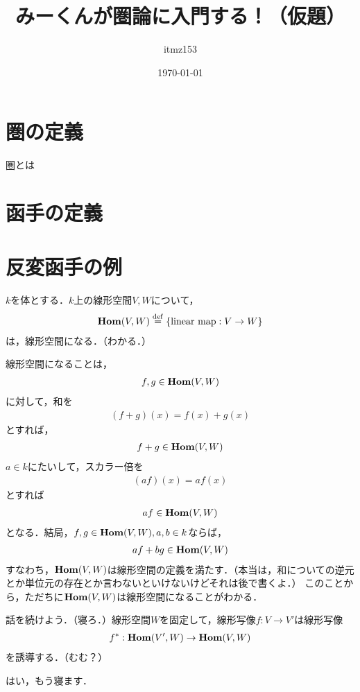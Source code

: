 \documentclass[12pt]{jsarticle}
\title{みーくんが圏論に入門する！（仮題）}
\date{\today}
\author{itmz153}
\begin{document}
\maketitle

\section{圏の定義}
圏とは

\section{函手の定義}

\section{反変函手の例}
$k$を体とする．$k$上の線形空間$V, W$について，
\begin{align*}
{\bold{Hom}}(V, W) \overset{\mathrm{def}}{=} \{{\rm{linear\ map}}: V \to W\}
\end{align*}
は，線形空間になる．（わかる．）

線形空間になることは，
\begin{align*}
f, g \in {\bold{Hom}}(V, W)
\end{align*}
に対して，和を
\begin{align*}
(f + g)(x) = f(x) + g(x)
\end{align*}
とすれば，
\begin{align*}
f + g \in {\bold{Hom}}(V, W)
\end{align*}
$a \in k$にたいして，スカラー倍を
\begin{align*}
(a f)(x) = af(x)
\end{align*}
とすれば
\begin{align*}
af \in {\bold{Hom}}(V, W)
\end{align*}
となる．結局，$f,g \in {\bold{Hom}}(V, W), a,b \in k$ならば，
\begin{align*}
af + bg \in {\bold{Hom}}(V, W)
\end{align*}
すなわち，${\bold{Hom}}(V, W)$は線形空間の定義を満たす．（本当は，和についての逆元とか単位元の存在とか言わないといけないけどそれは後で書くよ．）
このことから，ただちに${\bold{Hom}}(V, W)$は線形空間になることがわかる．

話を続けよう．（寝ろ．）線形空間$W$を固定して，線形写像$f:V \to V'$は線形写像
\begin{align*}
f^{*} :  {\bold{Hom}}(V', W) \to {\bold{Hom}}(V, W)
\end{align*}
を誘導する．（むむ？）

はい，もう寝ます．


\thispagestyle{empty}
\end{document}
